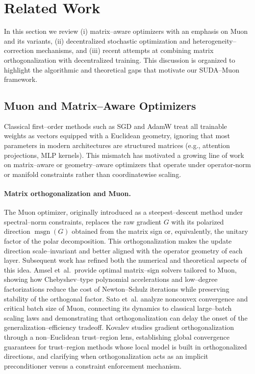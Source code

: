 
\section{Related Work}
\label{sec:related-work}

In this section we review (i) matrix–aware optimizers with an emphasis on Muon and its variants, (ii) decentralized stochastic optimization and heterogeneity–correction mechanisms, and (iii) recent attempts at combining matrix orthogonalization with decentralized training. This discussion is organized to highlight the algorithmic and theoretical gaps that motivate our SUDA–Muon framework.

\subsection{Muon and Matrix–Aware Optimizers}

Classical first–order methods such as SGD and AdamW treat all trainable weights as vectors equipped with a Euclidean geometry, ignoring that most parameters in modern architectures are structured matrices (e.g., attention projections, MLP kernels). This mismatch has motivated a growing line of work on matrix–aware or geometry–aware optimizers that operate under operator‐norm or manifold constraints rather than coordinatewise scaling.

\paragraph{Matrix orthogonalization and Muon.}
The Muon optimizer, originally introduced as a steepest–descent method under spectral–norm constraints, replaces the raw gradient $G$ with its polarized direction $\operatorname{msgn}(G)$ obtained from the matrix sign or, equivalently, the unitary factor of the polar decomposition. This orthogonalization makes the update direction scale–invariant and better aligned with the operator geometry of each layer. Subsequent work has refined both the numerical and theoretical aspects of this idea. Amsel et~al.\ provide optimal matrix–sign solvers tailored to Muon, showing how Chebyshev–type polynomial accelerations and low–degree factorizations reduce the cost of Newton–Schulz iterations while preserving stability of the orthogonal factor. Sato et~al. analyze nonconvex convergence and critical batch size of Muon, connecting its dynamics to classical large–batch scaling laws and demonstrating that orthogonalization can delay the onset of the generalization–efficiency tradeoff. Kovalev studies gradient orthogonalization through a non–Euclidean trust–region lens, establishing global convergence guarantees for trust–region methods whose local model is built in orthogonalized directions, and clarifying when orthogonalization acts as an implicit preconditioner versus a constraint enforcement mechanism.

